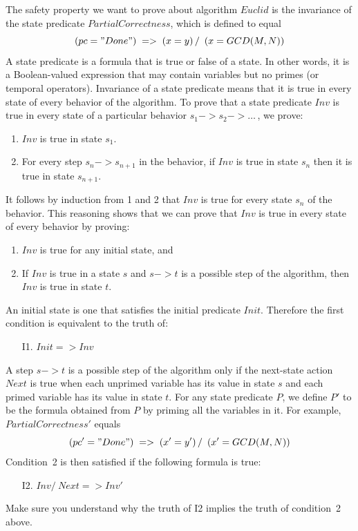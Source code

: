 \documentclass[fleqn,leqno]{article}
\begin{document}
The safety property we want to prove about algorithm $Euclid$ is the
invariance of the state predicate $PartialCorrectness$, which is defined
to equal
 \[ (pc = "Done") \;=>\; (x = y) \, /\ \, (x = GCD(M, N))
 \]
A 
state predicate is a formula that is true or false of a state.  In
other words, it is a Boolean-valued expression that may contain
variables but no primes (or temporal operators).  Invariance of a
state predicate means that it is true in every state of every behavior
of the algorithm.  To prove that a state predicate $Inv$ is true in
every state of a particular behavior
  $s_{1}->s_{2}-> \ldots$\,, 
we prove:
\begin{enumerate}
\item $Inv$ is true in state $s_{1}$.

\item For every step $s_{n}->s_{n+1}$ in the behavior, if $Inv$ is
true in state $s_{n}$ then it is true in state $s_{n+1}$.
\end{enumerate}
It follows by induction from 1 and 2 that $Inv$ is true for every
state $s_{n}$ of the behavior.  This reasoning shows that we
can prove that $Inv$ is true in every state of every behavior by
proving:
\begin{enumerate}
\item $Inv$ is true for any initial state, and

\item If $Inv$ is true in a state $s$ and $s->t$ is a possible step
of the algorithm, then $Inv$ is true in state $t$.
\end{enumerate}
An initial state is one that satisfies the initial predicate $Init$.
Therefore the first condition is equivalent to the truth of:
\begin{enumerate}
\item[I1.] $Init => Inv$
\end{enumerate}
A step $s -> t$ is a possible step of the algorithm only if the
next-state action $Next$ is true when each unprimed variable has its
value in state $s$ and each primed variable has its value in state
$t$.  For any state predicate $P$, we define $P'$ to be the formula
obtained from $P$ by priming all the variables in it.  For example,
$PartialCorrectness'$ equals
 \[ (pc' = "Done") \;=>\; (x' = y') \,/\ \,(x' = GCD(M, N))
 \]
Condition~2 is then satisfied if the following formula is true:
\begin{enumerate}
\item[I2.] 
$Inv /\ Next => Inv'$%
\end{enumerate}
Make sure you understand why the truth of I2 implies the truth of
condition~2 above.
\end{document}
